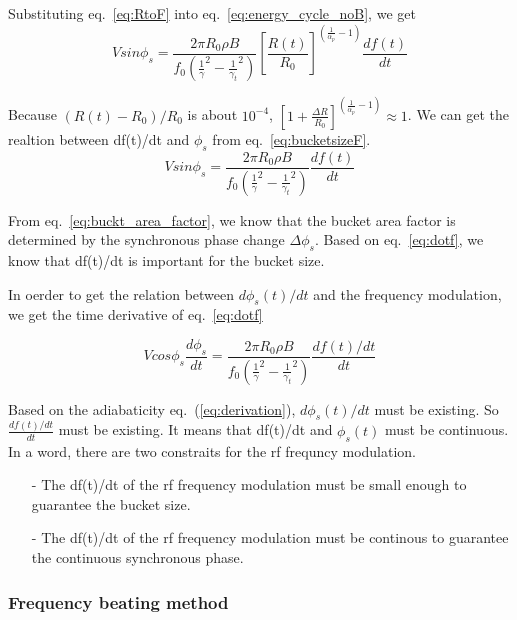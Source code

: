 \begin{itemize}
Substituting eq.~\ref{eq:RtoF} into eq.~\ref{eq:energy_cycle_noB}, we get
\begin{equation}
Vsin\phi_s=\frac{2\pi R_0 \rho B}{f_0(\frac{1}{\gamma}^2-\frac{1}{\gamma_t}^2)}[\frac{R(t)}{R_0}]^{(\frac{1}{\alpha_p}-1)}\frac{df(t)}{dt} 
\label{eq:bucketsizeF}
\end{equation}

Because $(R(t)-R_0)/R_0$ is about $10^{-4}$, $[1+\frac{\Delta R}{R_0}]^{(\frac{1}{\alpha_p}-1)}\approx 1$. We can get the realtion between df(t)/dt and $\phi_s$ from eq.~\ref{eq:bucketsizeF}.
\begin{equation}
Vsin\phi_s=\frac{2\pi R_0 \rho B}{f_0(\frac{1}{\gamma}^2-\frac{1}{\gamma_t}^2)}\frac{df(t)}{dt} 
\label{eq:dotf}
\end{equation}

From eq.~\ref{eq:buckt_area_factor}, we know that the bucket area factor is determined by the synchronous phase change $\Delta\phi_s$. Based on eq.~\ref{eq:dotf}, we know that df(t)/dt is important for the bucket size.

In oerder to get the relation between $d\phi_s(t)/dt$ and the frequency modulation, we get the time derivative of eq.~\ref{eq:dotf}

\begin{equation}
Vcos\phi_s\frac{d\phi_s}{dt}=\frac{2\pi R_0 \rho B}{f_0(\frac{1}{\gamma}^2-\frac{1}{\gamma_t}^2)}\frac{df(t)/dt}{dt} 
\label{eq:2dotf}
\end{equation}

Based on the adiabaticity eq.~(\ref{eq:derivation}), $d\phi_s(t)/ dt$ must be existing. So $\frac{df(t)/dt}{dt}$ must be existing. It means that df(t)/dt and $\phi_s(t)$ must be continuous. In a word, there are two constraits for the rf frequncy modulation.
\begin{itemize}
\item[-] The df(t)/dt of the rf frequency modulation must be small enough to guarantee the bucket size.
\item[-] The df(t)/dt of the rf frequency modulation must be continous to guarantee the continuous synchronous phase.
\end{itemize}

\end{itemize}

\subsubsection{Frequency beating method}


